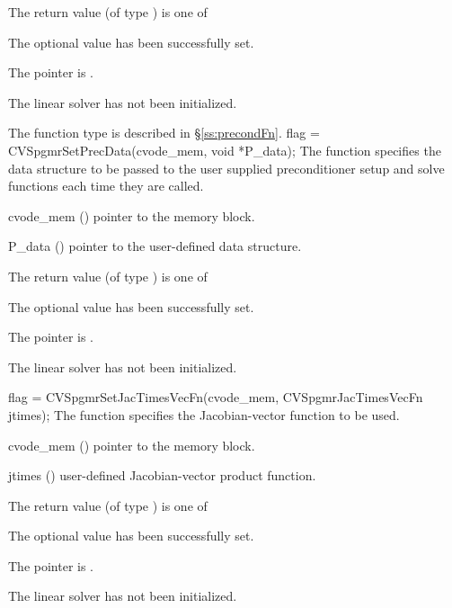 {
  The return value  (of type ) is one of
  \begin{args}
  \item[\Id{SUCCESS}] 
    The optional value has been successfully set.
  \item[\Id{LIN\_NO\_MEM}]
    The  pointer is .
  \item[\Id{LIN\_NO\_LMEM}]
    The {\cvspgmr} linear solver has not been initialized.
  \end{args}
}
{
   The function type  is described in \S\ref{ss:precondFn}.
}
{
  flag = CVSpgmrSetPrecData(cvode\_mem, void *P\_data);
}
{
  The function  specifies the data structure
  to be passed to the user supplied preconditioner setup and solve
  functions each time they are called.
}
{
  \begin{args}
  \item[cvode\_mem] ()
    pointer to the {\cvode} memory block.
  \item[P\_data] ()
     pointer to the user-defined data structure.
  \end{args}
}
{
  The return value  (of type ) is one of
  \begin{args}
  \item[\Id{SUCCESS}] 
    The optional value has been successfully set.
  \item[\Id{LIN\_NO\_MEM}]
    The  pointer is .
  \item[\Id{LIN\_NO\_LMEM}]
    The {\cvspgmr} linear solver has not been initialized.
  \end{args}
}
{}
{
  flag = CVSpgmrSetJacTimesVecFn(cvode\_mem, CVSpgmrJacTimesVecFn jtimes);
}
{
  The function  specifies the Jacobian-vector 
  function to be used.
}
{
  \begin{args}
  \item[cvode\_mem] ()
    pointer to the {\cvode} memory block.
  \item[jtimes] ()
    user-defined Jacobian-vector product function.
  \end{args}
}
{
  The return value  (of type ) is one of
  \begin{args}
  \item[\Id{SUCCESS}] 
    The optional value has been successfully set.
  \item[\Id{LIN\_NO\_MEM}]
    The  pointer is .
  \item[\Id{LIN\_NO\_LMEM}]
    The {\cvspgmr} linear solver has not been initialized.
  \end{args}
}
